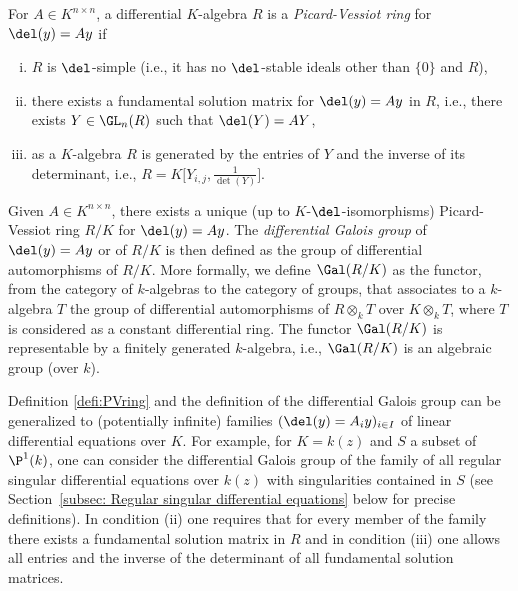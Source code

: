 \documentclass[a4paper, 11pt]{article}
\begin{document}
\begin{definition} \label{defi:PVring}
For $A \in K^{n \times n}$, a differential $K$-algebra $R$ is a \emph{Picard-Vessiot ring} for $\del(y) = Ay$ if
\begin{enumerate}[(i)]
	\item $R$ is $\del$-simple (i.e., it has no $\del$-stable ideals other than $\{0\}$ and $R$),
	\item there exists a fundamental solution matrix for $\del(y)=Ay$ in $R$, i.e., there exists $Y \in \GL_n(R)$ such that $\del(Y) = AY$,
		\item as a $K$-algebra $R$ is generated by the entries of $Y$ and the inverse of its determinant, i.e., $R = K\big[ Y_{i,j}, \frac{1}{\det(Y)}\big]$.                                                                                                                                         
\end{enumerate}
\end{definition}

Given $A\in K^{n\times n}$, there exists a unique (up to $K$-$\del$-isomorphisms) Picard-Vessiot ring $R/K$ for $\del(y)=Ay$. The \emph{differential Galois group} of $\del(y)=Ay$ or of $R/K$ is then defined as the group of differential automorphisms of $R/K$. More formally, we define $\Gal(R/K)$ as the functor, from the category of $k$-algebras to the category of groups, that associates to a $k$-algebra $T$ the group of differential automorphisms of $R\otimes_k T$ over $K\otimes_k T$, where $T$ is considered as a constant differential ring. The functor $\Gal(R/K)$ is representable by a finitely generated $k$-algebra, i.e., $\Gal(R/K)$ is an algebraic group (over $k$).



Definition \ref{defi:PVring} and the definition of the differential Galois group can be generalized to (potentially infinite) families $(\del(y)=A_iy)_{i\in I}$ of linear differential equations over $K$. For example, for $K=k(z)$ and $S$ a subset of $\P^1(k)$, one can consider the differential Galois group of the family of all regular singular differential equations over $k(z)$ with singularities contained in $S$ (see Section~\ref{subsec: Regular singular differential equations} below for precise definitions). In condition (ii) one requires that for every member of the family there exists a fundamental solution matrix in $R$ and in condition (iii) one allows all entries and the inverse of the determinant of all fundamental solution matrices. 
\end{document}
